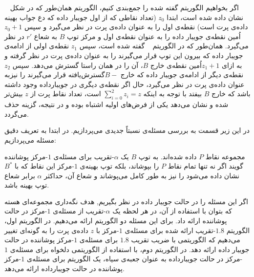 اگر بخواهیم الگوریتم گفته شده را جمع‌بندی کنیم، الگوریتم همان‌طور که در شکل ~ نشان داده شده است،
 ابتدا $z_0$ (تعداد نقاطی که از اول جویبار داده که دع جواب بهینه داده‌ی پرت است) نقطه‌ی اول را به عنوان داده‌ی پرت در نظر می‌گیرد و سپس $z_0 + 1$اُمین نقطه‌ی جویبار داده را به عنوان نقطه‌ی اول و مرکز توپ $B$ به شعاع $r'$ در نظر می‌گیرد.
همان‌طور که در الگوریتم ~ گفته شده است، سپس $z_1$ نقطه‌ی اولی از ادامه‌ی جویبار داده که بیرون این توپ قرار می‌گیرند را به عنوان داده‌ی پرت در نظر گرفته و به ازای $z_1+1$اُمین نقطه‌ی خارج $B$، آن را در همان راستا گسترش می‌دهد.
سپس $z_2$ نقطه‌ی دیگر از ادامه‌ی جویبار داده که خارج $B-$گسترش‌یافته قرار می‌گیرند را نیزبه عنوان داده‌ی پرت در نظر می‌گیرد، حال اگر نقطه‌ی دیگری در جویبارداده وجود داشته باشد که خارج $B$ بیفتد با توجه به اینکه $\sum_{i = 0}^{2} z_i = z$ است، تعداد نقاط پرت از $z$ بیش‌تر شده و نشان می‌دهد یکی از فرض‌های اولیه اشتباه بوده و در نتیجه، گزینه حذف می‌گردد.


در این زیر قسمت به بررسی مسئله‌ی نسبتاً جدیدی می‌پردازیم. در ابتدا به تعریف دقیق مسئله می‌پردازیم:


مجموعه نقاط $P$ داده شده‌اند. به توپ $B$ یک $\alpha$-تقریب برای مسئله‌ی $1$-مرکز‌ پوشاننده گویند اگر نه تنها تمام نقاط $P$ را بپوشاند، بلکه توپ بهینه‌ی $1$-مرکز این نقاط که با $B^*$ نشان داده می‌شود را نیز به طور کامل می‌پوشاند و شعاع آن، حداکثر $\alpha$ برابر شعاع توپ بهینه باشد. 


اگر این مسئله را در حالت جویبار داده در نظر بگیریم, هدف نگه‌داری مجموعه‌ای هسته که بتوان با استفاده از آن، در هر لحظه یک $\alpha$-تقریب از مسئله‌ی $1$-مرکز در حالت پوشاننده ارائه داد. برای این مسئله دو الگوریتم ارائه می‌دهیم. در الگوریتم اول، الگوریتم $1.8$-تقریب ارائه شده برای مسئله‌ی $1$-مرکز با $z$ داده‌ی پرت را به گونه‌ای تغییر می‌دهیم که الگوریتمی با ضریب تقریب $1.8$ برای مسئله‌ی $1$-مرکز پوشاننده در حالت جویبار داده ارائه دهد. در الگوریتم دوم، با استفاده از الگوریتمی دلخواه برای  مسئله‌ی $1$-مرکز در حالت جویبارداده به عنوان جعبه‌ی سیاه، یک الگوریتم برای مسئله‌ی $1$-مرکز پوشاننده در حالت جویبارداده ارائه می‌دهد.


